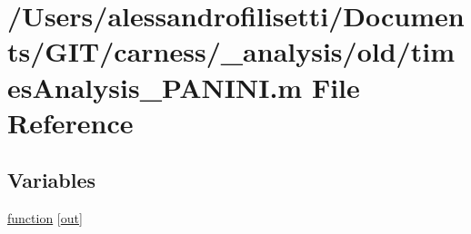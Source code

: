 \hypertarget{a00038}{\section{/\-Users/alessandrofilisetti/\-Documents/\-G\-I\-T/carness/\-\_\-analysis/old/times\-Analysis\-\_\-\-P\-A\-N\-I\-N\-I.m File Reference}
\label{a00038}
}
\subsection*{Variables}
\begin{DoxyCompactItemize}
\item 
\hyperlink{a00038_a370f3dd25136a73d619eba0aa2e3bb4b}{function} \mbox{[}\hyperlink{a00028_a34c820385e9209f49c18739329ad9206}{out}\mbox{]}
\end{DoxyCompactItemize}


